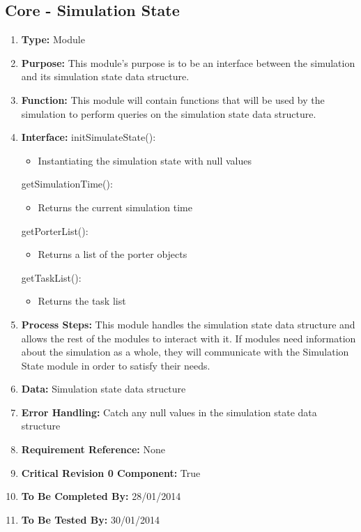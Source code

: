\documentclass[paper=letter, fontsize=10pt]{scrartcl}
\numberwithin{equation}{section}		%
\numberwithin{figure}{section}			%
\numberwithin{table}{section}				%
\begin{document}
\subsection{Core - Simulation State}
\begin{enumerate}[]
	\item \textbf{Type:} Module
	\item \textbf{Purpose:} This module's purpose is to be an interface between the simulation and its simulation state data structure.
	\item \textbf{Function:} This module will contain functions that will be used by the simulation to perform queries on the simulation state data structure.
	\item \textbf{Interface:}\newline
	initSimulateState():
		\begin{itemize}
			\item Instantiating the simulation state with null values
		\end{itemize}
	getSimulationTime():
		\begin{itemize}
			\item Returns the current simulation time
		\end{itemize}
	getPorterList():
		\begin{itemize}
			\item Returns a list of the porter objects
		\end{itemize}
	getTaskList():
		\begin{itemize}
			\item Returns the task list
		\end{itemize}			
	\item \textbf{Process Steps:} This module handles the simulation state data structure and allows the rest of the modules to interact with it.  If modules need information about the simulation as a whole, they will communicate with the Simulation State module in order to satisfy their needs. 
	\item \textbf{Data:} Simulation state data structure
	\item \textbf{Error Handling:} Catch any null values in the simulation state data structure
	\item \textbf{Requirement Reference:} None
	\item \textbf{Critical Revision 0 Component:} True
	\item \textbf{To Be Completed By:} 28/01/2014
	\item \textbf{To Be Tested By:} 30/01/2014
\end{enumerate}
\end{document}
